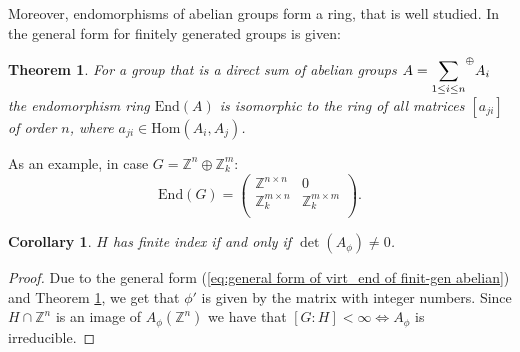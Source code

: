 \documentclass[a4paper,12pt]{amsart}
\newtheorem{theorem}{Theorem}
\newtheorem{corollary}{Corollary}[theorem]
\theoremstyle{definition}
\newcommand{\Imag}{\text{Im }}
\newcommand{\End}{\text{End}}
\newcommand{\Hom}{\text{Hom}}
\begin{document}
		
		
		
		
	
	
	Moreover, endomorphisms of abelian groups form a ring, that is well studied. In \cite{abelian_endomorphisms} the general form for finitely generated groups is given: 
	

	\begin{theorem} \label{theorem:abelian_endomorph}
		For a group that is a direct sum of abelian groups $A = {\mathlarger{\sum_{1 \le i \le n}}}^\oplus A_i$ the endomorphism ring $\End(A)$ is isomorphic to the ring of all matrices $[a_{ji}]$ of order $n$, where $a_{ji} \in \Hom(A_i, A_j)$.
	\end{theorem}

	As an example, in case $G = \mathbb{Z}^n \oplus \mathbb{Z}^m_k$: 
	$$
	\End(G) = 
	\begin{pmatrix}
		\mathbb{Z}^{n \times n} & 0 \\
		\mathbb{Z}^{m \times n}_k & \mathbb{Z}^{m \times m}_k \\
	\end{pmatrix}.
	$$  
	\begin{corollary}
		$H$ has finite index if and only if $\det(A_\phi) \ne 0$.
	\end{corollary}	
	\begin{proof}
		
		Due to the general form (\ref{eq:general form of virt_end of finit-gen abelian}) and Theorem \ref{theorem:abelian_endomorph}, we get that $\phi'$ is given by the matrix with integer numbers. Since $H \cap \mathbb{Z}^n$ is an image of $A_\phi (\mathbb{Z}^n)$ we have that $[G : H] < \infty \Leftrightarrow A_\phi$ is irreducible. 
	\end{proof}
\end{document}
